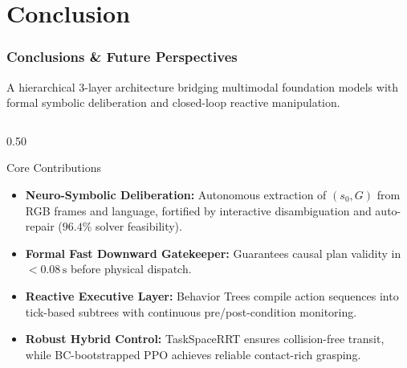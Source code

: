 \documentclass[10pt]{beamer}
\begin{document}
\section{Conclusion}
\begin{frame}[t]
    \frametitle{Conclusions \& Future Perspectives}
    \footnotesize
    A hierarchical 3-layer architecture bridging multimodal foundation models with formal symbolic deliberation and closed-loop reactive manipulation.

    \vspace{0.1cm}
    \begin{columns}[T]
        \begin{column}{0.50\textwidth}
            \begin{block}{Core Contributions}
                \begin{itemize}\scriptsize
                    \item \textbf{Neuro-Symbolic Deliberation:} Autonomous extraction of $(s_0, G)$ from RGB frames and language, fortified by interactive disambiguation and auto-repair ($96.4\%$ solver feasibility).
                    \item \textbf{Formal Fast Downward Gatekeeper:} Guarantees causal plan validity in $<0.08\,\text{s}$ before physical dispatch.
                    \item \textbf{Reactive Executive Layer:} Behavior Trees compile action sequences into tick-based subtrees with continuous pre/post-condition monitoring.
                    \item \textbf{Robust Hybrid Control:} TaskSpaceRRT ensures collision-free transit, while BC-bootstrapped PPO achieves reliable contact-rich grasping.
                \end{itemize}
            \end{block}
        \end{column}


\end{columns}
\end{frame}
\end{document}
